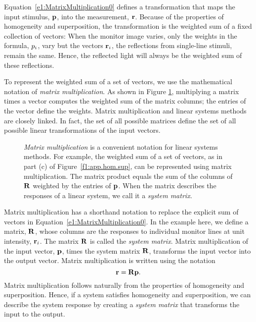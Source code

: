 Equation~\ref{e1:MatrixMultiplication0} defines
a transformation
that maps the input stimulus, $\mbox {$\bf p$}$, into the measurement, $\mbox {$\bf r$}$.
Because of the properties of homogeneity and superposition,
the transformation is the weighted sum of a fixed collection of vectors:
When the monitor image varies, only
the weights in the formula, $\mbox{$p_{i}$}$, vary but
the vectors $\mbox {$\bf r$}_i$, the reflections from single-line stimuli,
remain the same.
Hence, the reflected light will always be the weighted sum of these
reflections.

To represent the weighted sum of a set of
vectors, we use the mathematical notation of {\em matrix multiplication}.
As shown in Figure \ref{f1:MatMult},
multiplying a matrix times a vector
computes the weighted sum of the matrix columns;
the entries of the vector define the weights.
Matrix multiplication and linear systems methods are closely linked.
In fact, the set of all possible matrices define the set of 
all possible linear transformations of the input vectors.

\begin{figure}
\centerline {
}
\caption[Matrix Multiplication]{
{\em Matrix multiplication} is a convenient notation
for linear systems methods.
For example, the weighted sum of a set of vectors, as in part (c) of
Figure~\ref{f1:app.hom.sup}, can be represented using
matrix multiplication.
The matrix product equals the sum of
the columns of $\mbox {$\bf R$}$ weighted by the entries of $\mbox {$\bf p$}$.
When the matrix describes the responses
of a linear system, we call it a {\em system matrix.}
}
\label{f1:MatMult}
\end{figure}
Matrix multiplication has a shorthand notation
to replace the explicit sum of vectors in
Equation~\ref{e1:MatrixMultiplication0}.
In the example here, we define a
matrix, $\mbox {$\bf R$}$, whose columns are
the responses to individual monitor lines at unit intensity,
$\mbox {$\bf r$}_i$.
The matrix $\mbox {$\bf R$}$ is called the {\em system matrix}.
Matrix multiplication of the input vector, $\mbox {$\bf p$}$, times the 
system matrix $\mbox {$\bf R$}$,
transforms the input vector into the output vector.
Matrix multiplication is written using the notation
\begin{equation}
\mbox {$\bf r$} = \mbox {$\bf R$} \mbox {$\bf p$} .
\end{equation}
Matrix multiplication follows naturally from
the properties of homogeneity and superposition.
Hence, if a system satisfies homogeneity and superposition,
we can describe the system response by creating
a {\em system matrix} that transforms the input to the output.

